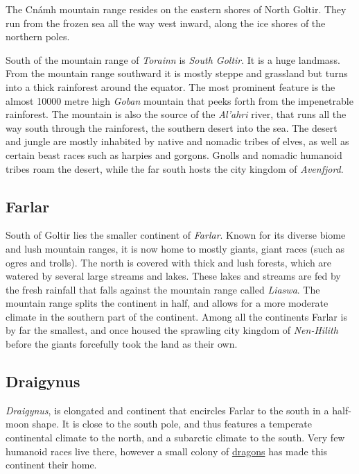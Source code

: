 The Cnámh mountain range resides on the eastern shores of North Goltir. They
run from the frozen sea all the way west inward, along the ice shores of the
northern poles.

South of the mountain range of \emph{Torainn} is \emph{South Goltir}. It is
a huge landmass. From the mountain range southward it is mostly steppe and
grassland but turns into a thick rainforest around the equator. The most
prominent feature is the almost 10000 metre high \emph{Goban} mountain that
peeks forth from the impenetrable rainforest. The mountain is also the source
of the \emph{Al'ahri} river, that runs all the way south through the
rainforest, the southern desert into the sea. The desert and jungle are mostly
inhabited by native and nomadic tribes of elves, as well as certain beast
races such as harpies and gorgons. Gnolls and nomadic humanoid tribes roam the
desert, while the far south hosts the city kingdom of \emph{Avenfjord}.

\subsection{Farlar}
\label{sec:Farlar}

South of Goltir lies the smaller continent of \emph{Farlar}. Known for its
diverse biome and lush mountain ranges, it is now home to mostly giants, giant
races (such as ogres and trolls). The north is covered with thick and lush
forests, which are watered by several large streams and lakes. These lakes
and streams are fed by the fresh rainfall that falls against the mountain range
called \emph{Liaswa}. The mountain range splits the continent in half, and
allows for a more moderate climate in the southern part of the continent. Among
all the continents Farlar is by far the smallest, and once housed the sprawling
city kingdom of \emph{Nen-Hilith} before the giants forcefully took the land as
their own.

\subsection{Draigynus}
\label{sec:Draigynus}

\emph{Draigynus}, is elongated and continent that encircles Farlar to the
south in a half-moon shape. It is close to the south pole, and thus features a
temperate continental climate to the north, and a subarctic climate to the
south. Very few humanoid races live there, however a small colony of
\hyperref[sec:Dragons]{dragons} has made this continent their home.

